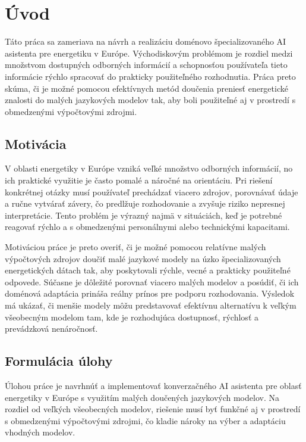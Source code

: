 
\chapter{Úvod}\label{ch:introduction}

Táto práca sa zameriava na návrh a realizáciu doménovo špecializovaného AI asistenta pre energetiku v Európe. Východiskovým problémom je rozdiel medzi množstvom dostupných odborných informácií a schopnosťou používateľa tieto informácie rýchlo spracovať do prakticky použiteľného rozhodnutia. Práca preto skúma, či je možné pomocou efektívnych metód doučenia preniesť energetické znalosti do malých jazykových modelov tak, aby boli použiteľné aj v prostredí s obmedzenými výpočtovými zdrojmi.

\section{Motivácia}

V oblasti energetiky v Európe vzniká veľké množstvo odborných informácií, no ich praktické využitie je často pomalé a náročné na orientáciu. Pri riešení konkrétnej otázky musí používateľ prechádzať viacero zdrojov, porovnávať údaje a ručne vytvárať závery, čo predlžuje rozhodovanie a zvyšuje riziko nepresnej interpretácie. Tento problém je výrazný najmä v situáciách, keď je potrebné reagovať rýchlo a s obmedzenými personálnymi alebo technickými kapacitami.

Motiváciou práce je preto overiť, či je možné pomocou relatívne malých výpočtových zdrojov doučiť malé jazykové modely na úzko špecializovaných energetických dátach tak, aby poskytovali rýchle, vecné a prakticky použiteľné odpovede. Súčasne je dôležité porovnať viacero malých modelov a posúdiť, či ich doménová adaptácia prináša reálny prínos pre podporu rozhodovania. Výsledok má ukázať, či menšie modely môžu predstavovať efektívnu alternatívu k veľkým všeobecným modelom tam, kde je rozhodujúca dostupnosť, rýchlosť a prevádzková nenáročnosť.


\section{Formulácia úlohy}

Úlohou práce je navrhnúť a implementovať konverzačného AI asistenta pre oblasť energetiky v Európe s využitím malých doučených jazykových modelov. Na rozdiel od veľkých všeobecných modelov, riešenie musí byť funkčné aj v prostredí s obmedzenými výpočtovými zdrojmi, čo kladie nároky na výber a adaptáciu vhodných modelov.

